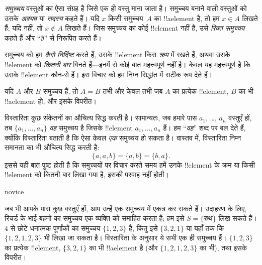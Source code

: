 \documentclass[../../../include/open-logic-section]{subfiles}
\begin{document}

\emph{समुच्चय} वस्तुओं का ऐसा संग्रह है जिसे एक ही वस्तु माना जाता है।
समुच्चय बनाने वाली वस्तुओं को उसके \emph{अवयव} या \emph{सदस्य} कहते हैं।
यदि $x$ किसी समुच्चय~$A$ का !!a{element} है, तो हम $x \in A$ लिखते हैं;
यदि नहीं, तो $x \notin A$ लिखते हैं। जिस समुच्चय का कोई !!{element} नहीं है,
उसे \emph{रिक्त समुच्चय} कहते हैं और ``$\emptyset$'' से निरूपित करते हैं।

\begin{explain}
समुच्चय को हम \emph{कैसे निर्दिष्ट} करते हैं, उसके !!{element} किस
\emph{क्रम} में रखते हैं, अथवा उसके !!{element} को \emph{कितनी बार}
गिनते हैं---इनमें से कोई बात महत्त्वपूर्ण नहीं है। केवल यह महत्त्वपूर्ण है कि
उसके !!{element} कौन-से हैं। इस विचार को हम निम्न सिद्धांत में सटीक रूप देते हैं।
\end{explain}

\begin{defn}[विस्तारिता]
  यदि $A$ और $B$ समुच्चय हैं, तो $A = B$ तभी और केवल तभी जब
  $A$ का प्रत्येक !!{element}, $B$ का भी !!a{element} हो, और इसके विपरीत।
\end{defn}

विस्तारिता कुछ संकेतनों का औचित्य सिद्ध करती है। सामान्यतः, जब हमारे पास
$a_{1}$, \dots, $a_{n}$ वस्तुएँ हों, तब $\{a_{1}, \dots, a_{n}\}$
\emph{वह} समुच्चय है जिसके !!{element} $a_1, \ldots, a_n$ हैं। हम
``\emph{वह}'' शब्द पर बल देते हैं, क्योंकि विस्तारिता बताती है कि ऐसा केवल
\emph{एक} समुच्चय हो सकता है। वास्तव में, विस्तारिता निम्न समानता का भी
औचित्य सिद्ध करती है:
  \[
    \{a, a, b\} = \{a, b\} = \{b,a\}.
  \]
इससे यही बात पुष्ट होती है कि समुच्चयों पर विचार करते समय हमें उनके
!!{element} के क्रम या किसी !!{element} को कितनी बार लिखा गया है, इसकी
परवाह नहीं होती।

\begin{tagblock}{novice}
\begin{ex}
जब भी आपके पास कुछ वस्तुएँ हों, आप उन्हें एक समुच्चय में एकत्र कर सकते हैं।
उदाहरण के लिए, रिचर्ड के भाई-बहनों का समुच्चय एक व्यक्ति को समाहित करता है;
हम इसे $S=\{\textrm{रुथ}\}$ लिख सकते हैं। $4$ से छोटे धनात्मक पूर्णांकों का
समुच्चय $\{1, 2, 3\}$ है, किंतु इसे $\{3, 2, 1\}$ या यहाँ तक कि
$\{1, 2, 1, 2, 3\}$ भी लिखा जा सकता है। विस्तारिता के अनुसार ये सभी एक ही
समुच्चय हैं। $\{1, 2, 3\}$ का प्रत्येक !!{element}, $\{3, 2, 1\}$ का भी
!!a{element} है (और $\{1, 2, 1, 2, 3\}$ का भी), तथा इसके विपरीत।
\end{ex}
\end{tagblock}
\end{document}
